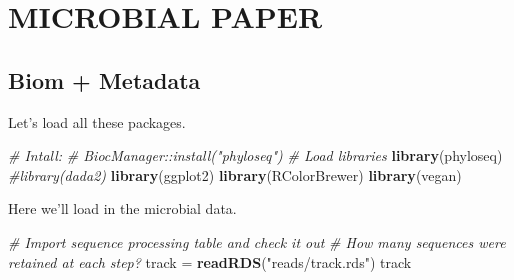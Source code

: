 \documentclass[]{article}
\newenvironment{Shaded}{\begin{snugshade}}{\end{snugshade}}
\newcommand{\CommentTok}[1]{\textcolor[rgb]{0.56,0.35,0.01}{\textit{#1}}}
\newcommand{\KeywordTok}[1]{\textcolor[rgb]{0.13,0.29,0.53}{\textbf{#1}}}
\newcommand{\NormalTok}[1]{#1}
\newcommand{\StringTok}[1]{\textcolor[rgb]{0.31,0.60,0.02}{#1}}
\begin{document}
\hypertarget{microbial-paper}{%
\section{MICROBIAL PAPER}\label{microbial-paper}}

\hypertarget{biom-metadata}{%
\subsection{Biom + Metadata}\label{biom-metadata}}

Let's load all these packages.

\begin{Shaded}
\begin{Highlighting}[]
\CommentTok{# Intall:}
\CommentTok{# BiocManager::install("phyloseq")}
\CommentTok{# Load libraries}
\KeywordTok{library}\NormalTok{(phyloseq)}
\CommentTok{#library(dada2)}
\KeywordTok{library}\NormalTok{(ggplot2)}
\KeywordTok{library}\NormalTok{(RColorBrewer)}
\KeywordTok{library}\NormalTok{(vegan)}
\end{Highlighting}
\end{Shaded}

Here we'll load in the microbial data.

\begin{Shaded}
\begin{Highlighting}[]
\CommentTok{# Import sequence processing table and check it out}
\CommentTok{# How many sequences were retained at each step?}
\NormalTok{track =}\StringTok{ }\KeywordTok{readRDS}\NormalTok{(}\StringTok{"reads/track.rds"}\NormalTok{)}
\NormalTok{track}
\end{Highlighting}
\end{Shaded}
\end{document}

